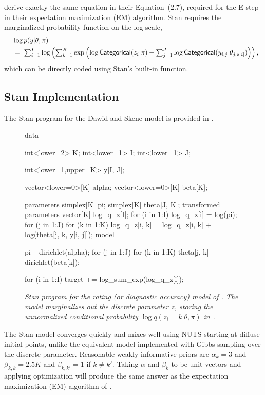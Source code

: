 \cite{DawidSkene:1979} derive exactly the same equation in their
Equation~(2.7), required for the E-step in their expectation
maximization (EM) algorithm.  Stan requires the marginalized
probability function on the log scale,
\[
\begin{array}{l}
\mbox{ } \ \log p(y | \theta, \pi)
\\[3pt]
\mbox{ } \  = \
\sum_{i=1}^I \log \left( \sum_{k=1}^K \exp
  \left( \log \mbox{\sf Categorical}(z_i | \pi)
         + \sum_{j=1}^J
         \log \mbox{\sf Categorical}(y_{i, j}|\theta_{j, z[i]})
  \right) \right),
\end{array}
\]
which can be directly coded using Stan's built-in 
function.


\subsection{Stan Implementation}

The Stan program for the Dawid and Skene model is provided in
.
%
\begin{figure}
\begin{stancode}
data {
  int<lower=2> K;
  int<lower=1> I;
  int<lower=1> J;

  int<lower=1,upper=K> y[I, J];

  vector<lower=0>[K] alpha;
  vector<lower=0>[K] beta[K];
}
parameters {
  simplex[K] pi;
  simplex[K] theta[J, K];
}
transformed parameters {
  vector[K] log_q_z[I];
  for (i in 1:I) {
    log_q_z[i] = log(pi);
    for (j in 1:J)
      for (k in 1:K)
        log_q_z[i, k] = log_q_z[i, k]
                         + log(theta[j, k, y[i, j]]);
  }
}
model {
  pi ~ dirichlet(alpha);
  for (j in 1:J)
    for (k in 1:K)
      theta[j, k] ~ dirichlet(beta[k]);

  for (i in 1:I)
    target += log_sum_exp(log_q_z[i]);
}
\end{stancode}
\vspace*{-12pt}
\caption{\small\it Stan program for the rating (or diagnostic
  accuracy) model of \cite{DawidSkene:1979}. The model marginalizes
  out the discrete parameter $z$, storing the unnormalized conditional
  probability $\log q(z_i=k|\theta,\pi)$ in\ \code{log\_q\_z[i,~k]}.}%
\label{dawid-skene-model.figure}
\end{figure}
%
The Stan model converges quickly and mixes well using NUTS starting at
diffuse initial points, unlike the equivalent model implemented with
Gibbs sampling over the discrete parameter.  Reasonable weakly
informative priors are $\alpha_k = 3$ and $\beta_{k,k} = 2.5 K$ and
$\beta_{k,k'} = 1$ if $k \neq k'$.  Taking $\alpha$ and $\beta_k$ to
be unit vectors and applying optimization will produce the same answer
as the expectation maximization (EM) algorithm of
\cite{DawidSkene:1979}.

